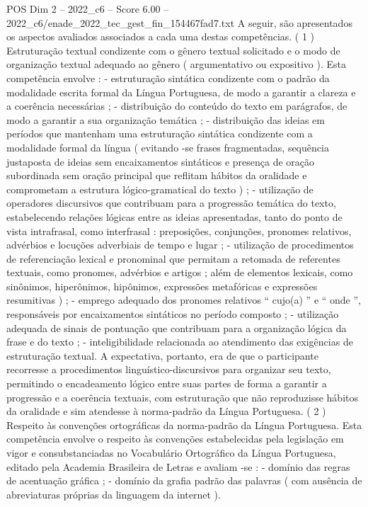 \begin{textsample}{POS Dim 2 – 2022\_c6 – Score 6.00 – 2022\_c6/enade\_2022\_tec\_gest\_fin\_154467fad7.txt}
A seguir, são apresentados os aspectos avaliados associados a cada uma destas competências. ( 1 ) Estruturação textual condizente com o gênero textual solicitado e o modo de organização textual adequado ao gênero ( argumentativo ou expositivo ).
Esta competência envolve : - estruturação sintática condizente com o padrão da modalidade escrita formal da Língua Portuguesa, de modo a garantir a clareza e a coerência necessárias ; - distribuição do conteúdo do texto em parágrafos, de modo a garantir a sua organização temática ; - distribuição das ideias em períodos que mantenham uma estruturação sintática condizente com a modalidade formal da língua ( evitando -se frases fragmentadas, sequência justaposta de ideias sem encaixamentos sintáticos e presença de oração subordinada sem oração principal que reflitam hábitos da oralidade e comprometam a estrutura lógico-gramatical do texto ) ; - utilização de operadores discursivos que contribuam para a progressão temática do texto, estabelecendo relações lógicas entre as ideias apresentadas, tanto do ponto de vista intrafrasal, como interfrasal : preposições, conjunções, pronomes relativos, advérbios e locuções adverbiais de tempo e lugar ; - utilização de procedimentos de referenciação lexical e pronominal que permitam a retomada de referentes textuais, como pronomes, advérbios e artigos ; além de elementos lexicais, como sinônimos, hiperônimos, hipônimos, expressões metafóricas e expressões resumitivas ) ; - emprego adequado dos pronomes relativos “ cujo(a) ” e “ onde ”, responsáveis por encaixamentos sintáticos no período composto ; - utilização adequada de sinais de pontuação que contribuam para a organização lógica da frase e do texto ; - inteligibilidade relacionada ao atendimento das exigências de estruturação textual.
A expectativa, portanto, era de que o participante recorresse a procedimentos linguístico-discursivos para organizar seu texto, permitindo o encadeamento lógico entre suas partes de forma a garantir a progressão e a coerência textuais, com estruturação que não reproduzisse hábitos da oralidade e sim atendesse à norma-padrão da Língua Portuguesa. ( 2 ) Respeito às convenções ortográficas da norma-padrão da Língua Portuguesa.
Esta competência envolve o respeito às convenções estabelecidas pela legislação em vigor e consubstanciadas no Vocabulário Ortográfico da Língua Portuguesa, editado pela Academia Brasileira de Letras e avaliam -se : - domínio das regras de acentuação gráfica ; - domínio da grafia padrão das palavras ( com ausência de abreviaturas próprias da linguagem da internet ).

\end{textsample}
